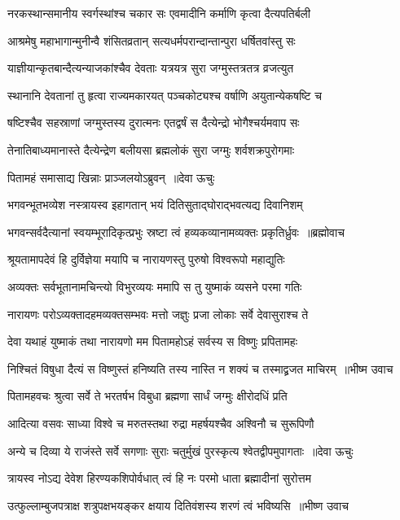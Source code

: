 \twolineshloka
{नरकस्थान्समानीय स्वर्गस्थांश्च चकार सः}
{एवमादीनि कर्माणि कृत्वा दैत्यपतिर्बली}


\twolineshloka
{आश्रमेषु महाभागान्मुनीन्वै शंसितव्रतान्}
{सत्यधर्मपरान्दान्तान्पुरा धर्षितवांस्तु सः}


\twolineshloka
{याज्ञीयान्कृतबान्दैत्यन्याजकांश्चैव देवताः}
{यत्रयत्र सुरा जग्मुस्तत्रतत्र व्रजत्युत}


\twolineshloka
{स्थानानि देवतानां तु हृत्वा राज्यमकारयत्}
{पञ्चकोट्यश्च वर्षाणि अयुतान्येकषष्टि च}


\twolineshloka
{षष्टिश्चैव सहस्राणां जग्मुस्तस्य दुरात्मनः}
{एतद्वर्षं स दैत्येन्द्रो भोगैश्चर्यमवाप सः}


\twolineshloka
{तेनातिबाध्यमानास्ते दैत्येन्द्रेण बलीयसा}
{ब्रह्मलोकं सुरा जग्मुः शर्वशक्रपुरोगमाः}


\twolineshloka
{पितामहं समासाद्य खिन्नाः प्राञ्जलयोऽब्रुवन् ॥देवा ऊचुः}
{}


\twolineshloka
{भगवन्भूतभव्येश नस्त्रायस्व इहागतान्}
{भयं दितिसुताद्घोराद्भवत्यद्य दिवानिशम्}


\threelineshloka
{भगवन्सर्वदैत्यानां स्वयम्भूरादिकृत्प्रभुः}
{स्रष्टा त्वं हव्यकव्यानामव्यक्तः प्रकृतिर्ध्रुवः ॥ब्रह्मोवाच}
{}


\twolineshloka
{श्रूयतामापदेवं हि दुर्विज्ञेया मयापि च}
{नारायणस्तु पुरुषो विश्वरूपो महाद्युतिः}


\twolineshloka
{अव्यक्तः सर्वभूतानामचिन्त्यो विभुरव्ययः}
{ममापि स तु युष्माकं व्यसने परमा गतिः}


\twolineshloka
{नारायणः परोऽव्यक्तादहमव्यक्तसम्भवः}
{मत्तो जज्ञुः प्रजा लोकाः सर्वे देवासुराश्च ते}


\twolineshloka
{देवा यथाहं युष्माकं तथा नारायणो मम}
{पितामहोऽहं सर्वस्य स विष्णुः प्रपितामहः}


\twolineshloka
{निश्चितं विषुधा दैत्यं स विष्णुस्तं हनिष्यति}
{तस्य नास्ति न शक्यं च तस्माद्व्रजत माचिरम् ॥भीष्म उवाच}


\twolineshloka
{पितामहवचः श्रुत्वा सर्वे ते भरतर्षभ}
{विबुधा ब्रह्मणा सार्धं जग्मुः क्षीरोदधिं प्रति}


\twolineshloka
{आदित्या वसवः साध्या विश्वे च मरुतस्तथा}
{रुद्रा महर्षयश्चैव अश्विनौ च सुरूपिणौ}


\threelineshloka
{अन्ये च दिव्या ये राजंस्ते सर्वे सगणाः सुराः}
{चतुर्मुखं पुरस्कृत्य श्वेतद्वीपमुपागताः ॥देवा ऊचुः}
{}


\twolineshloka
{त्रायस्व नोऽद्य देवेश हिरण्यकशिपोर्वधात्}
{त्वं हि नः परमो धाता ब्रह्मादीनां सुरोत्तम}


\twolineshloka
{उत्फुल्लाम्बुजपत्राक्ष शत्रुपक्षभयङ्कर}
{क्षयाय दितिवंशस्य शरणं त्वं भविष्यसि ॥भीष्ण उवाच}


